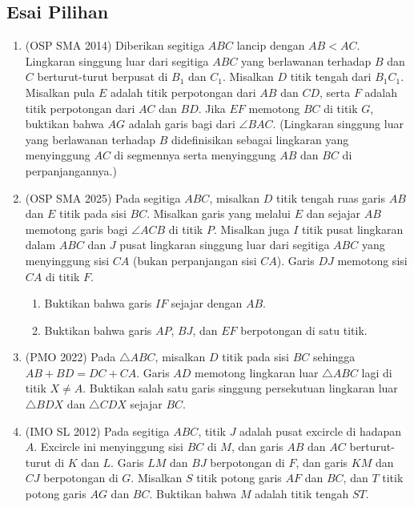 \documentclass[12pt]{scrartcl}
\begin{document}
\subsection{Esai Pilihan}
\begin{enumerate}[resume]

	\item (OSP SMA 2014)
	Diberikan segitiga $ABC$ lancip dengan $AB < AC$.
	Lingkaran singgung luar dari segitiga $ABC$ yang berlawanan terhadap
	$B$ dan $C$ berturut-turut berpusat di $B_1$ dan $C_1$.
	Misalkan $D$ titik tengah dari $B_1C_1$.
	Misalkan pula $E$ adalah titik perpotongan dari $AB$ dan $CD$,
	serta $F$ adalah titik perpotongan dari $AC$ dan $BD$.
	Jika $EF$ memotong $BC$ di titik $G$,
	buktikan bahwa $AG$ adalah garis bagi dari $\angle BAC$.
	(Lingkaran singgung luar yang berlawanan terhadap $B$ didefinisikan
	sebagai lingkaran yang menyinggung $AC$ di segmennya serta menyinggung
	$AB$ dan $BC$ di perpanjangannya.)

	\item (OSP SMA 2025)
	Pada segitiga $ABC$, misalkan $D$ titik tengah ruas garis $AB$
	dan $E$ titik pada sisi $BC$.
	Misalkan garis yang melalui $E$ dan sejajar $AB$ memotong garis bagi
	$\angle ACB$ di titik $P$.
	Misalkan juga $I$ titik pusat lingkaran dalam $ABC$ dan $J$ pusat
	lingkaran singgung luar dari segitiga $ABC$ yang menyinggung sisi $CA$
	(bukan perpanjangan sisi $CA$).
	Garis $DJ$ memotong sisi $CA$ di titik $F$.
	\begin{enumerate}
		\item Buktikan bahwa garis $IF$ sejajar dengan $AB$.
		\item Buktikan bahwa garis $AP$, $BJ$, dan $EF$ berpotongan di satu titik.
	\end{enumerate}

	\item (PMO 2022)
	Pada $\triangle ABC$, misalkan $D$ titik pada sisi $BC$ sehingga
	$AB + BD = DC + CA$.
	Garis $AD$ memotong lingkaran luar $\triangle ABC$ lagi di titik
	$X \ne A$.
	Buktikan salah satu garis singgung persekutuan lingkaran luar
	$\triangle BDX$ dan $\triangle CDX$ sejajar $BC$.

	\item (IMO SL 2012)
	Pada segitiga $ABC$, titik $J$ adalah pusat excircle di hadapan $A$.
	Excircle ini menyinggung sisi $BC$ di $M$, dan garis $AB$ dan $AC$
	berturut-turut di $K$ dan $L$.
	Garis $LM$ dan $BJ$ berpotongan di $F$, dan garis $KM$ dan $CJ$
	berpotongan di $G$.
	Misalkan $S$ titik potong garis $AF$ dan $BC$,
	dan $T$ titik potong garis $AG$ dan $BC$.
	Buktikan bahwa $M$ adalah titik tengah $ST$.


\end{enumerate}
\end{document}
